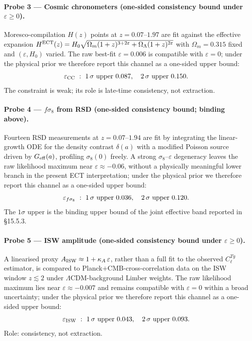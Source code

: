 \paragraph{Probe 3 --- Cosmic chronometers (one-sided consistency bound under $\varepsilon\geq 0$).}
Moresco-compilation $H(z)$ points at $z=0.07$--$1.97$ are fit against
the effective expansion
$H^{\rm ECT}(z) = H_0\sqrt{\Omega_m(1+z)^{3+2\varepsilon}
  + \Omega_\Lambda(1+z)^{2\varepsilon}}$
with $\Omega_m=0.315$ fixed and $(\varepsilon,H_0)$ varied. The raw
best-fit $\varepsilon = 0.006$ is compatible with $\varepsilon=0$;
under the physical prior we therefore report this channel as a one-sided upper bound:
\begin{equation}
  \varepsilon_{\rm CC}\ :\
  \text{1\,\ensuremath{\sigma}\ upper } 0.087,\quad
  \text{2\,\ensuremath{\sigma}\ upper } 0.150.
  \label{eq:eps_cc_retained}
\end{equation}
The constraint is weak; its role is late-time consistency, not
extraction.

\paragraph{Probe 4 --- $f\sigma_8$ from RSD (one-sided consistency bound; binding above).}
Fourteen RSD measurements at $z=0.07$--$1.94$ are fit by integrating
the linear-growth ODE for the density contrast $\delta(a)$ with a
modified Poisson source driven by $G_{\rm eff}(a)$, profiling
$\sigma_8(0)$ freely. A strong $\sigma_8$--$\varepsilon$ degeneracy
leaves the raw likelihood maximum near $\varepsilon \approx -0.06$,
without a physically meaningful lower branch in the present ECT
interpretation; under the physical prior we therefore report this
channel as a one-sided upper bound:
\begin{equation}
  \varepsilon_{f\sigma_8}\ :\
  \text{1\,\ensuremath{\sigma}\ upper } 0.036,\quad
  \text{2\,\ensuremath{\sigma}\ upper } 0.120.
  \label{eq:eps_fsigma8_retained}
\end{equation}
The $1\sigma$ upper is the binding upper bound of the joint effective
band reported in \S15.5.3.

\paragraph{Probe 5 --- ISW amplitude (one-sided consistency bound under $\varepsilon\geq 0$).}
A linearised proxy $A_{\rm ISW}\approx 1+\kappa_A\,\varepsilon$, rather
than a full fit to the observed $C_\ell^{Tg}$ estimator, is compared to
Planck$+$CMB-cross-correlation data on the ISW window $z\lesssim 2$
under $\Lambda$CDM-background Limber weights. The raw likelihood
maximum lies near $\varepsilon \approx -0.007$ and remains compatible
with $\varepsilon = 0$ within a broad uncertainty; under the physical
prior we therefore report this channel as a one-sided upper bound:
\begin{equation}
  \varepsilon_{\rm ISW}\ :\
  \text{1\,\ensuremath{\sigma}\ upper } 0.043,\quad
  \text{2\,\ensuremath{\sigma}\ upper } 0.093.
  \label{eq:eps_isw_retained}
\end{equation}
Role: consistency, not extraction.

